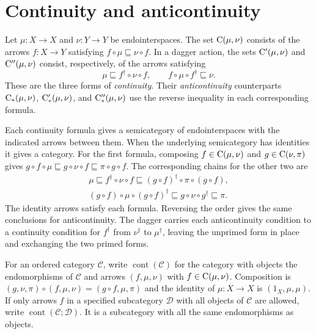 \section{Continuity and anticontinuity}\label{sec-osa-continuity}

\begin{defn}\label{def-osa-continuity}
Let $\mu:X\to X$ and $\nu:Y\to Y$ be endointerspaces. The set
$\mathrm{C}(\mu,\nu)$ consists of the arrows $f:X\to Y$ satisfying
$f\circ\mu\sqsubseteq\nu\circ f$. In a dagger action, the sets
$\mathrm{C}'(\mu,\nu)$ and $\mathrm{C}''(\mu,\nu)$ consist,
respectively, of the arrows satisfying
\[
 \mu\sqsubseteq f^\dagger\circ\nu\circ f,
 \qquad
 f\circ\mu\circ f^\dagger\sqsubseteq\nu .
\]
These are the three forms of \emph{continuity}. Their
\emph{anticontinuity} counterparts
$\mathrm{C}_\ast(\mu,\nu)$, $\mathrm{C}_\ast'(\mu,\nu)$,
and $\mathrm{C}_\ast''(\mu,\nu)$ use the reverse inequality
in each corresponding formula.
\end{defn}

Each continuity formula gives a semicategory of endointerspaces
with the indicated arrows between them. When the underlying
semicategory has identities it gives a category. For the first
formula, composing $f\in\mathrm{C}(\mu,\nu)$ and
$g\in\mathrm{C}(\nu,\pi)$ gives
$g\circ f\circ\mu\sqsubseteq g\circ\nu\circ f\sqsubseteq
\pi\circ g\circ f$. The corresponding chains for the other two are
\[
\begin{gathered}
 \mu\sqsubseteq f^\dagger\circ\nu\circ f
 \sqsubseteq (g\circ f)^\dagger\circ\pi\circ(g\circ f),\\
 (g\circ f)\circ\mu\circ(g\circ f)^\dagger
 \sqsubseteq g\circ\nu\circ g^\dagger\sqsubseteq\pi.
\end{gathered}
\]
The identity arrows satisfy each formula. Reversing the order gives
the same conclusions for anticontinuity. The dagger carries each
anticontinuity condition to a continuity condition for
$f^\dagger$ from $\nu^\dagger$ to $\mu^\dagger$, leaving the
unprimed form in place and exchanging the two primed forms.

\begin{defn}\label{def-osa-cont-category}
For an ordered category $\mathcal C$, write
$\operatorname{cont}(\mathcal C)$ for the category with objects
the endomorphisms of $\mathcal C$ and arrows $(f,\mu,\nu)$ with
$f\in\mathrm{C}(\mu,\nu)$. Composition is
$(g,\nu,\pi)\circ(f,\mu,\nu)=(g\circ f,\mu,\pi)$ and the
identity of $\mu:X\to X$ is $(1_X,\mu,\mu)$.
If only arrows $f$ in a specified subcategory $\mathcal D$ with
all objects of $\mathcal C$ are allowed, write
$\operatorname{cont}(\mathcal C;\mathcal D)$. It is a subcategory
with all the same endomorphisms as objects.
\end{defn}

